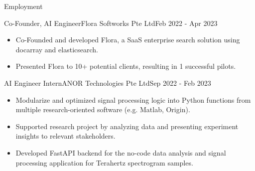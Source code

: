 \documentclass[]{mcdowellcv}
\begin{document}
	\makeheader
	

	\begin{cvsection}{Employment}
		
		
		
		
		\begin{cvsubsection}{Co-Founder, AI Engineer}{Flora Softworks Pte Ltd}{Feb 2022 - Apr 2023}
			\begin{itemize}
			
				\item Co-Founded and developed Flora, a SaaS enterprise search solution using docarray and elasticsearch.
			
				\item Presented Flora to 10+ potential clients, resulting in 1 successful pilots.
			
			\end{itemize}
		\end{cvsubsection}
		
		
		
		\begin{cvsubsection}{AI Engineer Intern}{ANOR Technologies Pte Ltd}{Sep 2022 - Feb 2023}
			\begin{itemize}
			
				\item Modularize and optimized signal processing logic into Python functions from multiple research-oriented software (e.g. Matlab, Origin).
			
				\item Supported research project by analyzing data and presenting experiment insights to relevant stakeholders.
			
				\item Developed FastAPI backend for the no-code data analysis and signal processing application for Terahertz spectrogram samples.
			
			\end{itemize}
		\end{cvsubsection}
		
		
		
		
	\end{cvsection}
	
\end{document}
